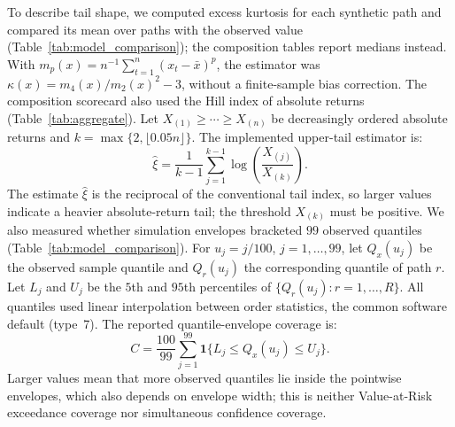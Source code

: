 To describe tail shape, we computed excess kurtosis for each
synthetic path and compared its mean over paths with the observed value
(Table~\ref{tab:model_comparison}); the composition tables report
medians instead. With
$m_p(x)=n^{-1}\sum_{t=1}^{n}(x_t-\bar x)^p$, the estimator was
$\kappa(x)=m_4(x)/m_2(x)^2-3$, without a finite-sample bias
correction. The composition scorecard also used the Hill index of
absolute returns (Table~\ref{tab:aggregate}). Let
$X_{(1)}\ge\cdots\ge X_{(n)}$ be decreasingly ordered absolute
returns and $k=\max\{2,\lfloor0.05n\rfloor\}$. The implemented
upper-tail estimator is:
\begin{equation}
 \hat\xi=\frac{1}{k-1}\sum_{j=1}^{k-1}
             \log\!\left(\frac{X_{(j)}}{X_{(k)}}\right).
 \label{eq:hill}
\end{equation}
The estimate $\hat\xi$ is the reciprocal of the conventional tail
index, so larger values indicate a heavier absolute-return tail; the
threshold $X_{(k)}$ must be positive.
We also measured whether simulation envelopes bracketed $99$ observed quantiles (Table~\ref{tab:model_comparison}). For $u_j=j/100$, $j=1,\ldots,99$,
let $Q_x(u_j)$ be the observed sample quantile and
$Q_r(u_j)$ the corresponding quantile of path $r$. Let
$L_j$ and $U_j$ be the $5$th and $95$th percentiles of
$\{Q_r(u_j):r=1,\ldots,R\}$. All quantiles used linear interpolation
between order statistics, the common software default (type~7). The reported
quantile-envelope coverage is:
\begin{equation}
 C=\frac{100}{99}\sum_{j=1}^{99}
       \mathbf{1}\{L_j\le Q_x(u_j)\le U_j\}.
 \label{eq:quantile-envelope-coverage}
\end{equation}
Larger values mean that more observed quantiles lie inside the pointwise envelopes, which also depends on envelope width; this is neither Value-at-Risk exceedance coverage nor simultaneous confidence coverage.

